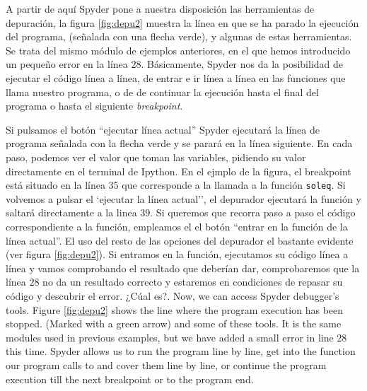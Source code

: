 \begin{paracol}{2}
A partir de aquí Spyder pone a nuestra disposición las herramientas de depuración, la figura \ref{fig:depu2} muestra la línea en que se ha parado la ejecución del programa, (señalada con una flecha verde), y algunas de estas herramientas. Se trata del mismo módulo de ejemplos anteriores, en el que hemos introducido un pequeño error en la línea $28$.  Básicamente, Spyder nos da la posibilidad de ejecutar el código línea a línea, de entrar e ir línea a línea en las funciones que llama nuestro programa, o de de continuar la ejecución hasta el final del programa o hasta el siguiente \emph{breakpoint}.

Si pulsamos el botón ``ejecutar línea actual'' Spyder ejecutará la línea de programa señalada con la flecha verde y se parará en la línea siguiente. En cada paso, podemos ver el valor que toman las variables, pidiendo su valor directamente en el terminal de Ipython. En el ejmplo de la figura, el breakpoint está situado en la línea $35$ que corresponde a la llamada a la función \texttt{soleq}. Si volvemos a pulsar el `ejecutar la línea actual'', el depurador ejecutará la función y saltará directamente a la linea $39$. Si queremos que recorra paso a paso el código correspondiente a la función, empleamos el el botón ``entrar en la función de la línea actual''. El uso del resto de las opciones del depurador el bastante evidente (ver figura \ref{fig:depu2}). Si entramos en la función, ejecutamos su código línea a línea y vamos comprobando el resultado que deberían dar, comprobaremos que la línea $28$ no da un resultado correcto y estaremos en condiciones de repasar su código y descubrir el error. ¿Cúal es?.
\switchcolumn
Now, we can access Spyder debugger's tools. Figure \ref{fig:depu2} shows the line where the program execution has been stopped. (Marked with a green arrow) and some of these tools. It is the same modules used in previous examples, but we have added a small error in line $28$ this time. Spyder allows us to run the program line by line, get into the function our program calls to and cover them line by line, or continue the program execution till the next breakpoint or to the program end. 


\end{paracol}
